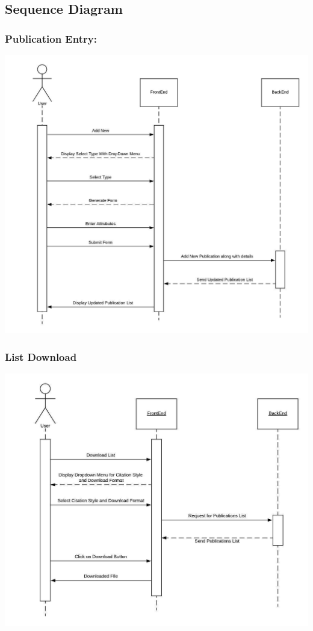 \documentclass[12pt]{extarticle}
\begin{document}
	\subsection{Sequence Diagram}
		\subsubsection{Publication Entry:}
		\includegraphics[scale=0.7]{seq/fill_form}
	
		\subsubsection{List Download }
		\includegraphics[scale=0.7]{seq/download_list}
		
\end{document}
